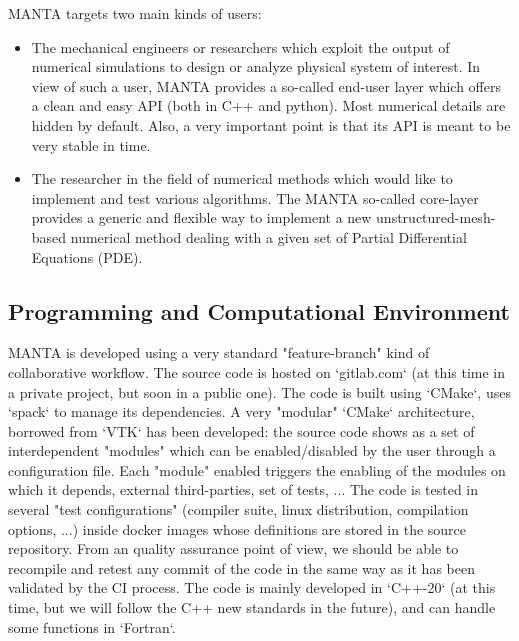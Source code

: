 MANTA targets two main kinds of users:
\begin{itemize}
    \item The mechanical engineers or researchers which exploit the output of numerical simulations
to design or analyze physical system of interest. In view of such a user, MANTA provides
a so-called end-user layer which offers a clean and easy API (both in C++ and python).
Most numerical details are hidden by default. Also, a very important point is that its API
is meant to be very stable in time.
    \item The researcher in the field of numerical methods which would like to implement and test
various algorithms. The MANTA so-called core-layer provides a generic and flexible way to
implement a new unstructured-mesh-based numerical method dealing with a given set of
Partial Differential Equations (PDE).
\end{itemize}

\subsection{Programming and Computational Environment}
\label{sec::MANTA:environment_capabilities}

MANTA is developed using a very standard "feature-branch" kind of collaborative workflow. The source code is hosted on `gitlab.com` (at this time in a private project, but soon in a public one). The code is built using `CMake`, uses `spack` to manage its dependencies. A very "modular" `CMake` architecture, borrowed from `VTK` has been developed: the source code shows as a set of interdependent "modules" which can be enabled/disabled by the user through a configuration file. Each "module" enabled triggers the enabling of the modules on which it depends, external third-parties, set of tests, ... The code is tested in several "test configurations" (compiler suite, linux distribution, compilation options, ...) inside docker images whose definitions are stored in the source repository. From an quality assurance point of view, we should be able to recompile and retest any commit of the code in the same way as it has been validated by the CI process. The code is mainly developed in `C++-20` (at this time, but we will follow the C++ new standards in the future), and can handle some functions in `Fortran`.

